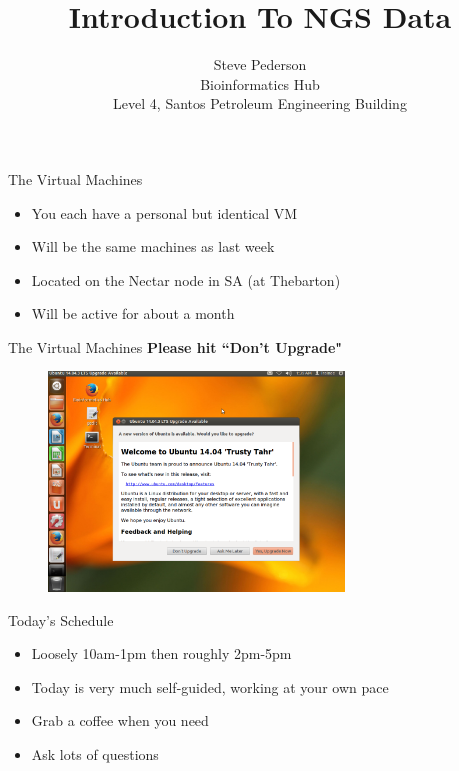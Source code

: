 \documentclass[11pt]{beamer}
\author{Steve Pederson\\
Bioinformatics Hub\\
Level 4, Santos Petroleum Engineering Building}
\title{Introduction To NGS Data}
\institute{University of Adelaide}
\begin{document}
\begin{frame}
\titlepage
\end{frame}


\begin{frame}{The Virtual Machines}
\begin{itemize}
\item You each have a personal but identical VM
\item Will be the same machines as last week
\item Located on the Nectar node in SA (at Thebarton)
\item Will be active for about a month
\end{itemize}
\end{frame}

\begin{frame}{The Virtual Machines}
\textbf{Please hit ``Don't Upgrade"}
\begin{figure}[h!]
  \centering
    \includegraphics[width=0.7\textwidth]{images/upgrade.png}
\end{figure}
\end{frame}

\begin{frame}{Today's Schedule}
\begin{itemize}
  \item Loosely 10am-1pm then roughly 2pm-5pm
  \item Today is very much self-guided, working at your own pace
  \item Grab a coffee when you need
  \item Ask lots of questions
\end{itemize}
\end{frame}
\end{document}
